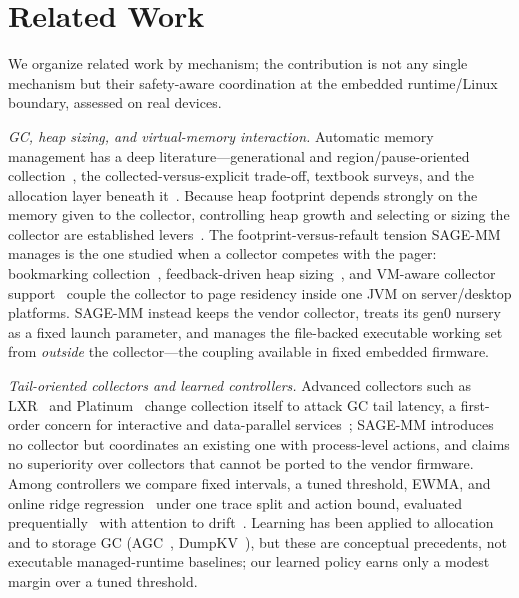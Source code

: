\section{Related Work}
\label{sec:related}

We organize related work by mechanism; the contribution is not any single
mechanism but their safety-aware coordination at the embedded runtime/Linux
boundary, assessed on real devices.

\emph{GC, heap sizing, and virtual-memory interaction.} Automatic memory
management has a deep literature---generational and region/pause-oriented
collection~\cite{detlefs2004g1}, the
collected-versus-explicit
trade-off, textbook surveys, and the allocation layer beneath
it~\cite{wilson1995survey}. Because heap
footprint depends strongly on the memory
given to the collector, controlling heap growth and selecting or sizing the
collector are established levers~\cite{brecht2006heapgrowth}. The
footprint-versus-refault tension SAGE-MM manages is the
one studied when a collector competes with the pager: bookmarking
collection~\cite{hertz2005paging}, feedback-driven heap
sizing~\cite{grzegorczyk2007islavista}, and VM-aware collector
support~\cite{yang2006cramm} couple the collector to page residency inside one
JVM on server/desktop platforms. SAGE-MM instead keeps the vendor collector,
treats its gen0 nursery as a fixed launch parameter, and manages the file-backed
executable working set from \emph{outside} the collector---the coupling available
in fixed embedded firmware.

\emph{Tail-oriented collectors and learned controllers.} Advanced collectors such
as LXR~\cite{lxr2022} and Platinum~\cite{platinum2020} change collection itself to
attack GC tail latency, a first-order concern for interactive and data-parallel
services~\cite{dean2013tail}; SAGE-MM introduces
no collector but coordinates an existing one with process-level actions, and
claims no superiority over collectors that cannot be ported to the vendor
firmware. Among controllers we compare fixed intervals, a tuned threshold, EWMA,
and online ridge regression~\cite{hoerl1970ridge} under one trace split and action
bound, evaluated prequentially~\cite{dawid1984prequential} with attention to
drift~\cite{gama2014drift}. Learning has been applied to
allocation~\cite{maas2020llama} and to storage GC (AGC~\cite{agc2025},
DumpKV~\cite{dumpkv2024}), but these are conceptual precedents, not executable
managed-runtime baselines; our learned policy earns only a modest margin over a
tuned threshold.

